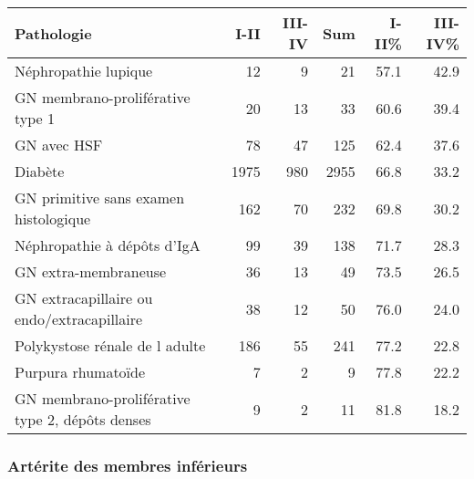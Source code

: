 \documentclass[11pt,a4paper]{article}\usepackage[]{graphicx}\usepackage[]{color}
\begin{document}
\begin{table}[H]
\centering
\begin{tabular}{lrrrrr}
  \hline
Pathologie & I-II & III-IV & Sum & I-II\% & III-IV\% \\ 
  \hline
Néphropathie lupique & 12 &  9 & 21 & 57.1 & 42.9 \\ 
  GN membrano-proliférative type 1 & 20 & 13 & 33 & 60.6 & 39.4 \\ 
  GN avec HSF & 78 & 47 & 125 & 62.4 & 37.6 \\ 
  Diabète & 1975 & 980 & 2955 & 66.8 & 33.2 \\ 
  GN primitive sans examen histologique & 162 & 70 & 232 & 69.8 & 30.2 \\ 
  Néphropathie à dépôts d'IgA & 99 & 39 & 138 & 71.7 & 28.3 \\ 
  GN extra-membraneuse & 36 & 13 & 49 & 73.5 & 26.5 \\ 
  GN extracapillaire ou endo/extracapillaire & 38 & 12 & 50 & 76.0 & 24.0 \\ 
  Polykystose rénale de l adulte & 186 & 55 & 241 & 77.2 & 22.8 \\ 
  Purpura rhumatoïde &  7 &  2 &  9 & 77.8 & 22.2 \\ 
  GN membrano-proliférative type 2, dépôts denses &  9 &  2 & 11 & 81.8 & 18.2 \\ 
   \hline
\end{tabular}
\end{table}



\subsubsection*{Artérite des membres inférieurs}
\end{document}
